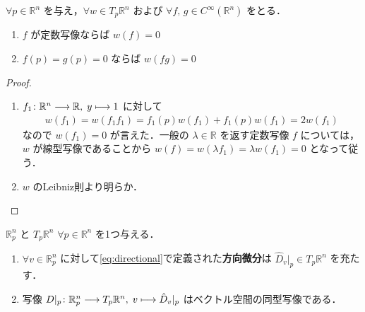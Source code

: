 \documentclass[geometry_main]{subfiles}
\begin{document}
\begin{mylem}[label=lem:tangentv-Rn]{}
	$\forall p \in \mathbb{R}^n$ を与え，$\forall w \in T_p \mathbb{R}^n$ および $\forall f,\, g \in C^\infty(\mathbb{R}^n)$ をとる．
	\begin{enumerate}
		\item $f$ が定数写像ならば $w(f) = 0$
		\item $f(p) = g(p) = 0$ ならば $w(fg) = 0$
	\end{enumerate}
\end{mylem}

\begin{proof}
	\begin{enumerate}
		\item $f_1 \colon \mathbb{R}^n \longrightarrow \mathbb{R},\; y \longmapsto 1$ に対して
		\begin{align}
			w(f_1) = w(f_1f_1) = f_1(p) w(f_1) + f_1(p) w(f_1) = 2 w(f_1)
		\end{align}
		なので $w(f_1) = 0$ が言えた．一般の $\lambda \in \mathbb{R}$ を返す定数写像 $f$ については，$w$ が線型写像であることから $w(f) = w(\lambda f_1) = \lambda w(f_1) = 0$ となって従う．
		\item $w$ のLeibniz則より明らか．
	\end{enumerate}
\end{proof}

\begin{myprop}[label=prop:tangentv-Rn]{$\mathbb{R}^n_p$ と $T_p \mathbb{R}^n$}
	$\forall p \in \mathbb{R}^n$ を1つ与える．
	\begin{enumerate}
		\item $\forall v \in \mathbb{R}_p^n$ に対して\eqref{eq:directional}で定義された\textbf{方向微分}は $\hat{D}_{v}|_p \in T_p \mathbb{R}^n$ を充たす．
		\item 写像 $D|_p \colon \mathbb{R}^n_p \longrightarrow T_p \mathbb{R}^n,\; v \longmapsto \hat{D}_v|_p$ はベクトル空間の同型写像である．
	\end{enumerate}
\end{myprop}
\end{document}
